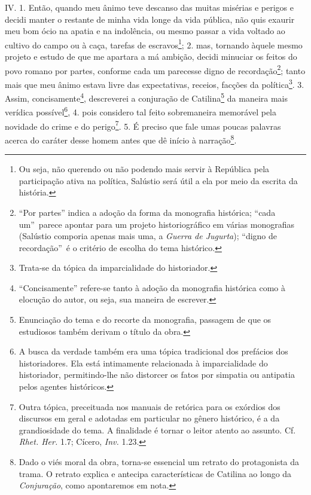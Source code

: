 IV. 1. Então, quando meu ânimo teve descanso das muitas misérias e perigos e
decidi manter o restante de minha vida longe da vida pública, não quis exaurir
meu bom ócio na apatia e na indolência, ou mesmo passar a vida voltado ao
cultivo do campo ou à caça, tarefas de escravos\footnote{Ou seja, não querendo
ou não podendo mais servir à República pela participação ativa na política,
Salústio será útil a ela por meio da escrita da história.}; 2. mas, tornando
àquele mesmo projeto e estudo de que me apartara a má ambição, decidi minuciar
os feitos do povo romano por partes, conforme cada um parecesse digno de
recordação\footnote{``Por partes'' indica a adoção da forma da monografia
histórica; ``cada um''\ parece apontar para um projeto historiográfico em
várias monografias (Salústio comporia apenas mais uma, a \emph{Guerra de
Jugurta}); ``digno de recordação''\ é o critério de escolha do tema
histórico.}; tanto mais que meu ânimo estava livre das expectativas, receios,
facções da política\footnote{Trata-se da tópica da imparcialidade do
historiador.}. 3. Assim, concisamente\footnote{``Concisamente'' refere-se tanto
à adoção da monografia histórica como à elocução do autor, ou seja, sua maneira
de escrever.}, descreverei a conjuração de Catilina\footnote{Enunciação do tema
e do recorte da monografia, passagem de que os estudiosos também derivam o
título da obra.} da maneira mais verídica possível\footnote{A busca da verdade
também era uma tópica tradicional dos prefácios dos
historiadores. Ela está intimamente relacionada à imparcialidade do
historiador, permitindo-lhe não distorcer os fatos por simpatia ou antipatia
pelos agentes históricos.}, 4. pois considero tal feito sobremaneira memorável
pela novidade do crime e do perigo\footnote{Outra tópica, preceituada nos
manuais de retórica para os exórdios dos discursos em geral e adotadas em
particular no gênero histórico, é a da grandiosidade do tema. A finalidade é
tornar o leitor atento ao assunto. Cf. \emph{Rhet. Her.} 1.7; Cícero, \emph{Inv.} 1.23.}. 5. É preciso que fale umas poucas
palavras acerca do caráter desse homem antes que dê início à
narração\footnote{Dado o viés moral da obra, torna-se essencial um retrato do
protagonista da trama. O retrato explica e antecipa características de Catilina
ao longo da \emph{Conjuração}, como apontaremos em nota.}.

